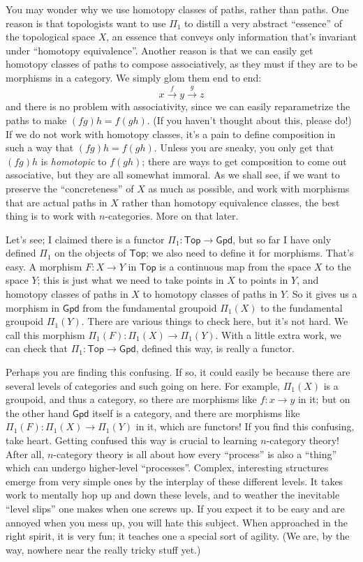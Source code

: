 \documentclass{article}
\begin{document}
You may wonder why we use homotopy classes of paths, rather than paths.
One reason is that topologists want to use \(\Pi_1\) to distill a very
abstract ``essence'' of the topological space \(X\), an essence that
conveys only information that's invariant under ``homotopy
equivalence''. Another reason is that we can easily get homotopy classes
of paths to compose associatively, as they must if they are to be
morphisms in a category. We simply glom them end to end:
\[x\xrightarrow{f}y\xrightarrow{g}z\] and there is no problem with
associativity, since we can easily reparametrize the paths to make
\((fg)h = f(gh)\). (If you haven't thought about this, please do!) If we
do not work with homotopy classes, it's a pain to define composition in
such a way that \((fg)h = f(gh)\). Unless you are sneaky, you only get
that \((fg)h\) is \emph{homotopic} to \(f(gh)\); there are ways to get
composition to come out associative, but they are all somewhat immoral.
As we shall see, if we want to preserve the ``concreteness'' of \(X\) as
much as possible, and work with morphisms that are actual paths in \(X\)
rather than homotopy equivalence classes, the best thing is to work with
\(n\)-categories. More on that later.

Let's see; I claimed there is a functor
\(\Pi_1\colon\mathsf{Top}\to\mathsf{Gpd}\), but so far I have only
defined \(\Pi_1\) on the objects of \(\mathsf{Top}\); we also need to
define it for morphisms. That's easy. A morphism \(F\colon X\to Y\) in
\(\mathsf{Top}\) is a continuous map from the space \(X\) to the space
\(Y\); this is just what we need to take points in \(X\) to points in
\(Y\), and homotopy classes of paths in \(X\) to homotopy classes of
paths in \(Y\). So it gives us a morphism in \(\mathsf{Gpd}\) from the
fundamental groupoid \(\Pi_1(X)\) to the fundamental groupoid
\(\Pi_1(Y)\). There are various things to check here, but it's not hard.
We call this morphism \(\Pi_1(F)\colon\Pi_1(X)\to\Pi_1(Y)\). With a
little extra work, we can check that
\(\Pi_1\colon\mathsf{Top}\to\mathsf{Gpd}\), defined this way, is really
a functor.

Perhaps you are finding this confusing. If so, it could easily be
because there are several levels of categories and such going on here.
For example, \(\Pi_1(X)\) is a groupoid, and thus a category, so there
are morphisms like \(f\colon x\to y\) in it; but on the other hand
\(\mathsf{Gpd}\) itself is a category, and there are morphisms like
\(\Pi_1(F)\colon\Pi_1(X)\to\Pi_1(Y)\) in it, which are functors! If you
find this confusing, take heart. Getting confused this way is crucial to
learning \(n\)-category theory! After all, \(n\)-category theory is all
about how every ``process'' is also a ``thing'' which can undergo
higher-level ``processes''. Complex, interesting structures emerge from
very simple ones by the interplay of these different levels. It takes
work to mentally hop up and down these levels, and to weather the
inevitable ``level slips'' one makes when one screws up. If you expect
it to be easy and are annoyed when you mess up, you will hate this
subject. When approached in the right spirit, it is very fun; it teaches
one a special sort of agility. (We are, by the way, nowhere near the
really tricky stuff yet.)
\end{document}
